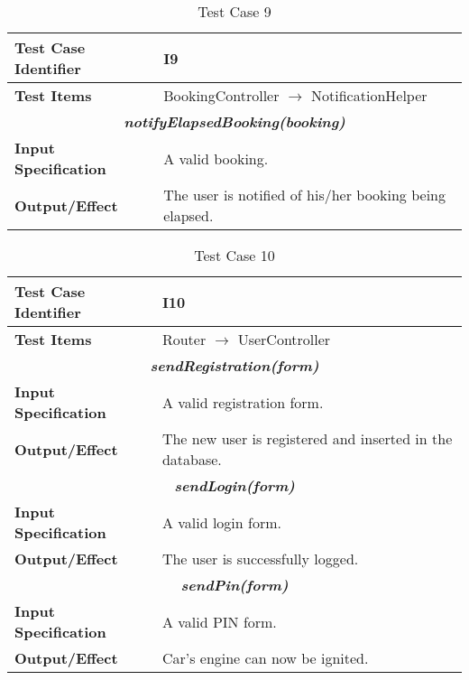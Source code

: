 \begin{table}[H]
	\begin{tabularx}{\textwidth}{l X}
		\hline
		\textbf{Test Case Identifier}	&	I9\\	\hline
		\textbf{Test Items}			&	BookingController $\rightarrow$ NotificationHelper \\	\hline\hline
		\multicolumn{2}{c}{\textbf{\textit{notifyElapsedBooking(booking)}}}	\\	\hline
			\textbf{Input Specification}	&	A valid booking.\\	\hline
			\textbf{Output/Effect}	&	The user is notified of his/her booking being elapsed.\\	\hline
	\end{tabularx}
	\captionsetup{textformat=empty,labelformat=blank}
	\caption{Test Case 9}
	\label{table:template-table-9}
\end{table}

\begin{table}[H]
	\begin{tabularx}{\textwidth}{l X}
		\hline
		\textbf{Test Case Identifier}	&	I10\\	\hline
		\textbf{Test Items}			&	Router $\rightarrow$ UserController \\	\hline\hline
		\multicolumn{2}{c}{\textbf{\textit{sendRegistration(form)}}}	\\	\hline
			\textbf{Input Specification}	&	A valid registration form.\\	\hline
			\textbf{Output/Effect}	&	The new user is registered and inserted in the database.\\	\hline\hline
		\multicolumn{2}{c}{\textbf{\textit{sendLogin(form)}}}	\\	\hline
			\textbf{Input Specification}	&	A valid login form.\\	\hline
			\textbf{Output/Effect}	&	The user is successfully logged.\\	\hline\hline
		\multicolumn{2}{c}{\textbf{\textit{sendPin(form)}}}	\\	\hline
			\textbf{Input Specification}	&	A valid PIN form.\\	\hline
			\textbf{Output/Effect}	&	Car's engine can now be ignited.\\	\hline
	\end{tabularx}
	\captionsetup{textformat=empty,labelformat=blank}
	\caption{Test Case 10}
	\label{table:template-table-10}
\end{table}

